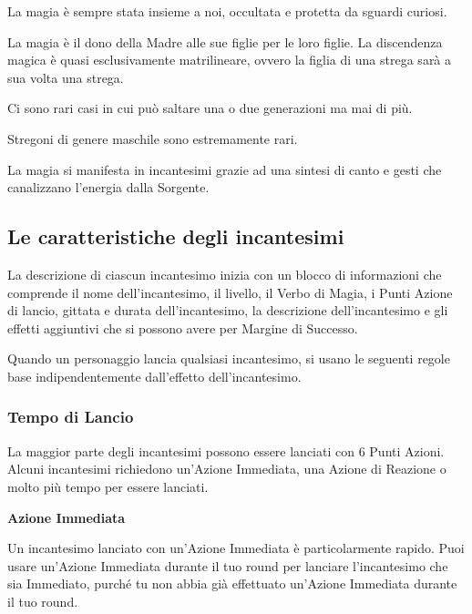 \documentclass[12pt,a4paper,twoside,openany]{book}
\begin{document}
\begin{multicols}{2}
	


La magia è sempre stata insieme a noi, occultata e protetta da sguardi curiosi.

La magia è il dono della Madre alle sue figlie per le loro figlie.
La discendenza magica è quasi esclusivamente matrilineare, ovvero la figlia di una strega sarà a sua volta una strega.

Ci sono rari casi in cui può saltare una o due generazioni ma mai di più.

Stregoni di genere maschile sono estremamente rari.

La magia si manifesta in incantesimi grazie ad una sintesi di canto e gesti che canalizzano l'energia dalla Sorgente.

\subsection{Le caratteristiche degli incantesimi}\label{caratteristicheincantesimi}

La descrizione di ciascun incantesimo inizia con un blocco di informazioni che comprende il nome dell'incantesimo, il livello, il Verbo di Magia, i Punti Azione di lancio, gittata e durata dell'incantesimo, la descrizione dell'incantesimo e gli effetti aggiuntivi che si possono avere per Margine di Successo.

Quando un personaggio lancia qualsiasi incantesimo, si usano le seguenti regole base indipendentemente dall'effetto dell'incantesimo.

\subsubsection{Tempo di Lancio}\label{magietempodilancio}

La maggior parte degli incantesimi possono essere lanciati con 6 Punti Azioni. Alcuni incantesimi richiedono un'Azione Immediata, una Azione di Reazione o molto più tempo per essere lanciati.

\textbf{Azione Immediata}

Un incantesimo lanciato con un'Azione Immediata è particolarmente rapido. Puoi usare un'Azione Immediata durante il tuo round per lanciare l'incantesimo che sia Immediato, purché tu non abbia già effettuato un'Azione Immediata durante il tuo round.


\end{multicols}
\end{document}
